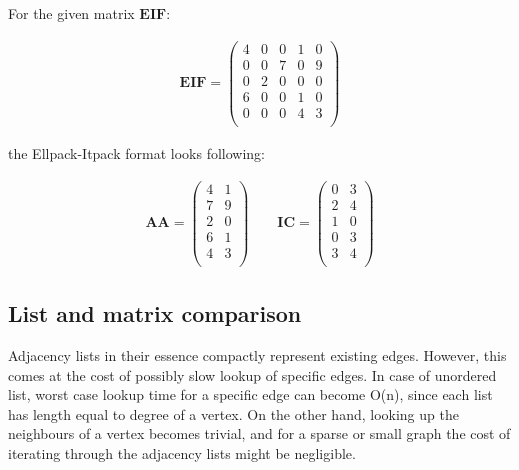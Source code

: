 \documentclass[thesis=M,english]{FITthesis}[2012/10/20]
\begin{document}
For the given matrix $\textbf{EIF}$:

$$
\begin{array}{c}
\textbf{EIF} = 
\begin{pmatrix}
4 & 0 & 0 & 1 & 0 \\
0 & 0 & 7 & 0 & 9 \\
0 & 2 & 0 & 0 & 0 \\
6 & 0 & 0 & 1 & 0 \\
0 & 0 & 0 & 4 & 3\\
\end{pmatrix}
\end{array}
$$

the Ellpack-Itpack format looks following:
 
$$
\begin{array}{lr}
\textbf{AA} = 
\begin{pmatrix}
4 & 1 \\
7 & 9 \\
2 & 0 \\
6 & 1 \\
4 & 3 \\
\end{pmatrix}
\quad \quad
\textbf{IC} = 
\begin{pmatrix}
0 & 3  \\
2 & 4 \\
1 & 0 \\
0 & 3\\
3 & 4 \\
\end{pmatrix}
\end{array}
$$

\subsection{List and matrix comparison}

Adjacency lists in their essence compactly represent existing edges. 
However, this comes at the cost of possibly slow lookup of specific edges.
In case of unordered list, worst case lookup time for a specific edge can become O(n), since each list has length equal to degree of a vertex.
On the other hand, looking up the neighbours of a vertex becomes trivial, and for a sparse or small graph the cost of iterating through the adjacency lists might be negligible.
\end{document}
